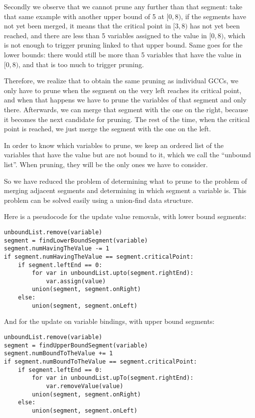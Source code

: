 \documentclass[a4paper,10pt]{article}
\begin{document}
Secondly we observe that we cannot prune any further than that segment: take that same example with another upper bound of 5 at $[0,8)$, if the segments have not yet been merged, it means that the critical point in $[3,8)$ has not yet been reached, and there are less than 5 variables assigned to the value in $[0,8)$, which is not enough to trigger pruning linked to that upper bound. Same goes for the lower bounds: there would still be more than 5 variables that have the value in $[0,8)$, and that is too much to trigger pruning.

Therefore, we realize that to obtain the same pruning as individual GCCs, we only have to prune when the segment on the very left reaches its critical point, and when that happens we have to prune the variables of that segment and only there. Afterwards, we can merge that segment with the one on the right, because it becomes the next candidate for pruning. The rest of the time, when the critical point is reached, we just merge the segment with the one on the left.

In order to know which variables to prune, we keep an ordered list of the variables that have the value but are not bound to it, which we call the ``unbound list''. When pruning, they will be the only ones we have to consider.

So we have reduced the problem of determining what to prune to the problem of merging adjacent segments and determining in which segment a variable is. This problem can be solved easily using a union-find data structure.

Here is a pseudocode for the update value removals, with lower bound segments:
\begin{lstlisting}
unboundList.remove(variable)
segment = findLowerBoundSegment(variable)
segment.numHavingTheValue -= 1
if segment.numHavingTheValue == segment.criticalPoint:
    if segment.leftEnd == 0:
        for var in unboundList.upto(segment.rightEnd):
            var.assign(value)
        union(segment, segment.onRight)
    else:
        union(segment, segment.onLeft)
\end{lstlisting}

And for the update on variable bindings, with upper bound segments:
\begin{lstlisting}
unboundList.remove(variable)
segment = findUpperBoundSegment(variable)
segment.numBoundToTheValue += 1
if segment.numBoundToTheValue == segment.criticalPoint:
    if segment.leftEnd == 0:
        for var in unboundList.upTo(segment.rightEnd):
            var.removeValue(value)
        union(segment, segment.onRight)
    else:
        union(segment, segment.onLeft)
\end{lstlisting}
\end{document}
